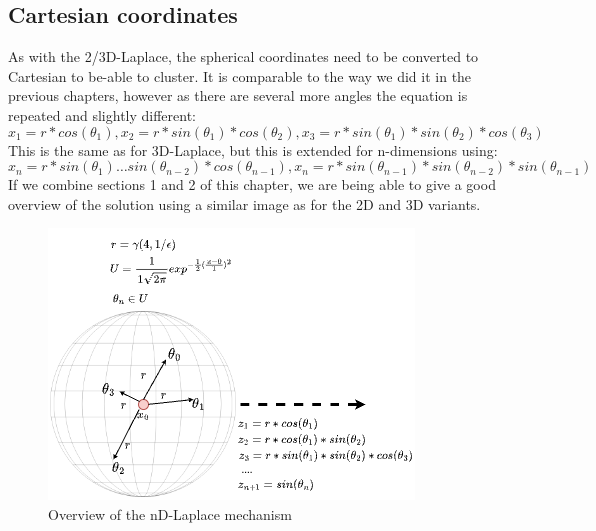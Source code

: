 \subsection{Cartesian coordinates}
As with the 2/3D-Laplace, the spherical coordinates need to be converted to Cartesian to be-able to cluster.
It is comparable to the way we did it in the previous chapters, however as there are several more angles the equation is repeated and slightly different:
\begin{equation}
  x_1 = r * cos (\theta_1),
  x_2 = r * sin (\theta_1) * cos (\theta_2),
  x_3 = r * sin(\theta_1) * sin(\theta_2) * cos(\theta_3)
\end{equation}
This is the same as for 3D-Laplace, but this is extended for n-dimensions using:
\begin{equation}
  x_{n} = r * sin(\theta_1) … sin(\theta_{n-2}) *cos (\theta_{n-1}), x_n= r * sin(\theta_{n-1}) * sin(\theta_{n-2}) * sin(\theta_{n-1})
\end{equation}
If we combine sections 1 and 2 of this chapter, we are being able to give a good overview of the solution using a similar image as for the 2D and 3D variants.
\begin{figure}
  \label{fig:nd-laplace-overview}
  \includegraphics{TheorethicalFramework/ND-Laplace/Images/nd_laplace.png}
  \caption{Overview of the nD-Laplace mechanism}
\end{figure}


